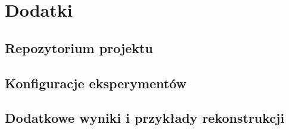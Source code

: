 \chapter{Dodatki}
\label{app:dodatki}

\section{Repozytorium projektu}
\label{app:repozytorium}


\section{Konfiguracje eksperymentów}
\label{app:konfiguracje}


\section{Dodatkowe wyniki i przykłady rekonstrukcji}
\label{app:dodatkowe-wyniki}

